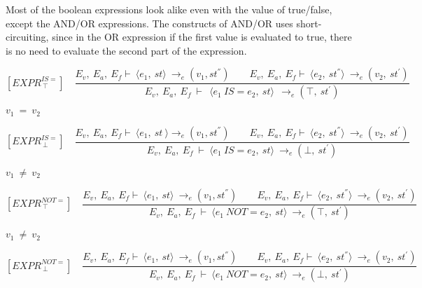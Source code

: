 	
	Most of the boolean expressions look alike even with the value of true/false, except the AND/OR expressions. The constructs of AND/OR uses short-circuiting, since in the OR expression if the first value is evaluated to true, there is no need to evaluate the second part of the expression.
	
	
	\[
	[EXPR^{IS=}_{\ \top}] \quad	
	\dfrac{E_v, \ E_a, \ E_f \vdash \ \langle e_1, \ st \rangle \ \rightarrow_e (v_1, st^{''}) \qquad E_v, \ E_a, \ E_f \vdash \ \langle e_2, \ st^{''} \rangle \ \rightarrow_e (v_2, \ st^{'})}{E_v, \ E_a, \ E_f \ \vdash \ \ \langle e_1 \ IS= e_2, \ st \rangle \ \ \rightarrow_e (\top, \ st^{'})}	
	\]
	
	
	\begin{math}		
		v_1 \ = \ v_2 		
	\end{math}
	
	
	
	
	
	\[
	[EXPR^{IS=}_{\ \bot}] \quad	
	\dfrac{E_v, \ E_a, \ E_f \vdash \ \langle e_1, \ st \ \rangle \rightarrow_e (v_1, st^{''}) \qquad E_v, \ E_a, \ E_f \vdash \ \langle e_2, \ st^{''} \rangle \ \rightarrow_e (v_2, \ st^{'})}{E_v, \ E_a, \ E_f \ \vdash \ \langle e_1 \ IS= e_2, \ st \rangle \ \rightarrow_e (\bot, \ st^{'})}	
	\]
	
	
	\begin{math}		
		v_1 \ \not= \ v_2		
	\end{math}
	
	
	
	
	
	
	
	
	\[	
	[EXPR^{NOT=}_{\ \top}] \quad	
	\dfrac{E_v, \ E_a, \ E_f \vdash \ \langle e_1, \ st \rangle \ \rightarrow_e (v_1, st^{''}) \qquad E_v, \ E_a, \ E_f \vdash \ \langle e_2, \ st^{''} \rangle \ \rightarrow_e (v_2, \ st^{'})}{E_v, \ E_a, \ E_f \ \vdash \ \langle e_1 \ NOT= e_2, \ st \rangle \ \rightarrow_e (\top, \ st^{'})}	
	\]
	
	
	\begin{math}		
		v_1 \ \not= \ v_2		
	\end{math} 
	
	
	
	
	
	
	
	
	\[
	[EXPR^{NOT=}_{\ \bot}] \quad	
	\dfrac{E_v, \ E_a, \ E_f \vdash \ \langle e_1, \ st \rangle \ \rightarrow_e (v_1, st^{''}) \qquad E_v, \ E_a, \ E_f \vdash \ \langle e_2, \ st^{''} \rangle \ \rightarrow_e (v_2, \ st^{'})}{E_v, \ E_a, \ E_f \ \vdash \ \langle e_1 \ NOT= e_2, \ st \rangle \ \rightarrow_e (\bot, \ st^{'})}	
	\]
	
